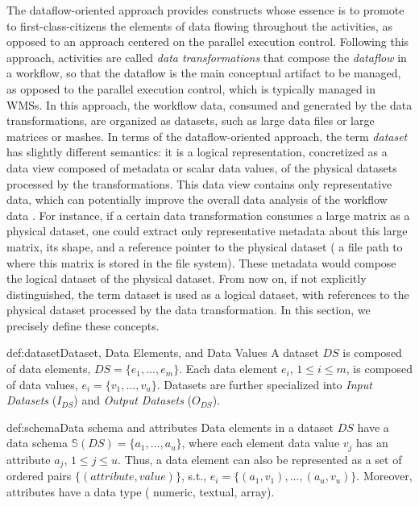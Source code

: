 The dataflow-oriented approach provides constructs whose essence is to promote to first-class-citizens
the elements of data flowing throughout the
activities, as opposed to an approach centered on the parallel execution control.
Following this approach, activities are called \textit{data transformations} that compose the \textit{dataflow} in a workflow, so that the dataflow is the main conceptual artifact to be managed, as opposed to the parallel execution control, which is typically managed in WMSs.
In this approach, the workflow data, consumed and generated by the data transformations, are organized as datasets, such as large data files or large matrices or mashes.
In terms of the dataflow-oriented approach, the term \textit{dataset} has slightly different semantics: it is a logical representation, concretized as a data view composed of metadata or scalar data values, of the physical datasets processed by the transformations.
This data view contains only representative data, which can potentially improve the overall data analysis of the workflow data \cite{Silva2017Raw, souza_keeping_2019}.
For instance, if a certain data transformation consumes a large matrix as a physical dataset, one could extract only representative metadata about this large matrix, its shape, and a reference pointer to the physical dataset (\eg{} a file path to where this matrix is stored in the file system). These metadata would compose the logical dataset of the physical dataset. From now on, if not explicitly distinguished, the term dataset is used as a logical dataset, with references to the physical dataset processed by the data transformation.
In this section, we precisely define these concepts.

\begin{mydef}{def:dataset}{Dataset, Data Elements, and Data Values}
A dataset $DS$ is composed of data elements, \ie{} $DS=\{e_1,...,e_m\}$.
Each data element $e_i$, $1 \leq i \leq m$, is composed of data values, \ie{} $e_i=\{v_1,...,v_u\}$.
Datasets are further specialized into \textit{Input Datasets} ($I_{DS}$) and \textit{Output Datasets} ($O_{DS}$).
\end{mydef}

\begin{mydef}{def:schema}{Data schema and attributes}
Data elements in a dataset $DS$ have a data schema $\mathbb{S}(DS) = \{a_1,...,a_u\}$,
where each element data value $v_j$  has an attribute $a_j$, $1 \leq j \leq u $.
Thus, a data element can also be represented as a set of ordered pairs $\{(attribute,value)\}$, s.t.,
$e_i = \{(a_1,v_1),..., (a_u,v_u)\}$.
Moreover, attributes have a data type (\eg{} numeric, textual, array).
\end{mydef}

